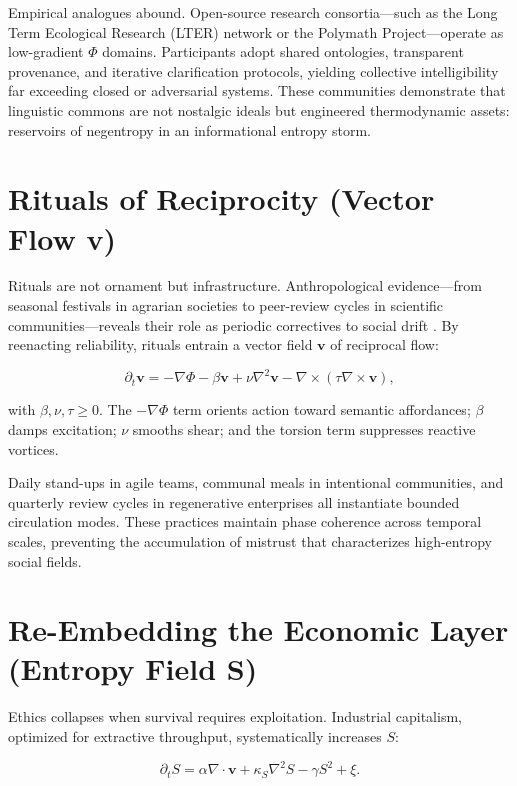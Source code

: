 \documentclass[12pt,a4paper]{article}
\begin{document}
Empirical analogues abound. Open-source research consortia—such as the Long Term Ecological Research (LTER) network or the Polymath Project—operate as low-gradient $\Phi$ domains. Participants adopt shared ontologies, transparent provenance, and iterative clarification protocols, yielding collective intelligibility far exceeding closed or adversarial systems. These communities demonstrate that linguistic commons are not nostalgic ideals but engineered thermodynamic assets: reservoirs of negentropy in an informational entropy storm.

\section{Rituals of Reciprocity (Vector Flow v)}
Rituals are not ornament but infrastructure. Anthropological evidence—from seasonal festivals in agrarian societies to peer-review cycles in scientific communities—reveals their role as periodic correctives to social drift \cite{bateson1972steps}. By reenacting reliability, rituals entrain a vector field $\bm{v}$ of reciprocal flow:

\begin{equation}
\partial_t \bm{v} = -\nabla \Phi - \beta \bm{v} + \nu \nabla^2 \bm{v} - \nabla \times (\tau \nabla \times \bm{v}),
\label{eq:v-dynamics}
\end{equation}

with $\beta, \nu, \tau \ge 0$. The $-\nabla \Phi$ term orients action toward semantic affordances; $\beta$ damps excitation; $\nu$ smooths shear; and the torsion term suppresses reactive vortices.

Daily stand-ups in agile teams, communal meals in intentional communities, and quarterly review cycles in regenerative enterprises all instantiate bounded circulation modes. These practices maintain phase coherence across temporal scales, preventing the accumulation of mistrust that characterizes high-entropy social fields.

\section{Re-Embedding the Economic Layer (Entropy Field S)}
Ethics collapses when survival requires exploitation. Industrial capitalism, optimized for extractive throughput, systematically increases $S$:

\begin{equation}
\partial_t S = \alpha \nabla\!\cdot\!\bm{v} + \kappa_S \nabla^2 S - \gamma S^2 + \xi.
\label{eq:s-dynamics}
\end{equation}
\end{document}
